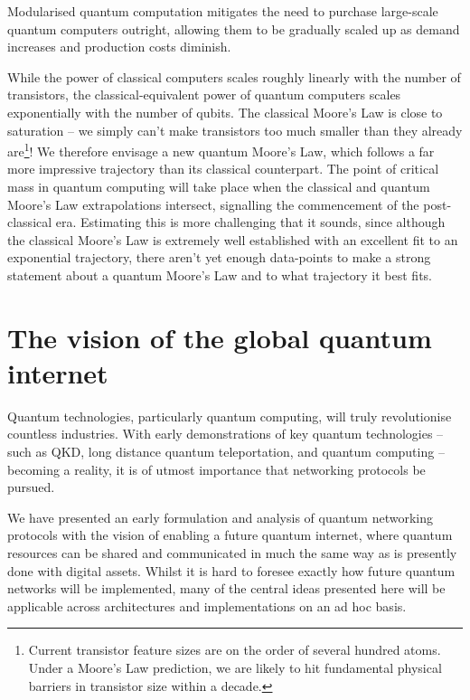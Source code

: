 \documentclass[aps,rmp,twocolumn,amsmath,amssymb,nofootinbib,superscriptaddress,longbibliography,floatfix]{revtex4-1}
\begin{document}
Modularised quantum computation mitigates the need to purchase large-scale quantum computers outright, allowing them to be gradually scaled up as demand increases and production costs diminish.

While the power of classical computers scales roughly linearly with the number of transistors, the classical-equivalent power of quantum computers scales exponentially with the number of qubits. The classical Moore's Law is close to saturation -- we simply can't make transistors too much smaller than they already are\footnote{Current transistor feature sizes are on the order of several hundred atoms. Under a Moore's Law prediction, we are likely to hit fundamental physical barriers in transistor size within a decade.}! We therefore envisage a new quantum Moore's Law, which follows a far more impressive trajectory than its classical counterpart. The point of critical mass in quantum computing will take place when the classical and quantum Moore's Law extrapolations intersect, signalling the commencement of the post-classical era. Estimating this is more challenging that it sounds, since although the classical Moore's Law is extremely well established with an excellent fit to an exponential trajectory, there aren't yet enough data-points to make a strong statement about a quantum Moore's Law and to what trajectory it best fits.

%
%

\section{The vision of the global quantum internet} \label{sec:vision_quant}

Quantum technologies, particularly quantum computing, will truly revolutionise countless industries. With early demonstrations of key quantum technologies -- such as QKD, long distance quantum teleportation, and quantum computing -- becoming a reality, it is of utmost importance that networking protocols be pursued.

We have presented an early formulation and analysis of quantum networking protocols with the vision of enabling a future quantum internet, where quantum resources can be shared and communicated in much the same way as is presently done with digital assets. Whilst it is hard to foresee exactly how future quantum networks will be implemented, many of the central ideas presented here will be applicable across architectures and implementations on an ad hoc basis.
\end{document}
